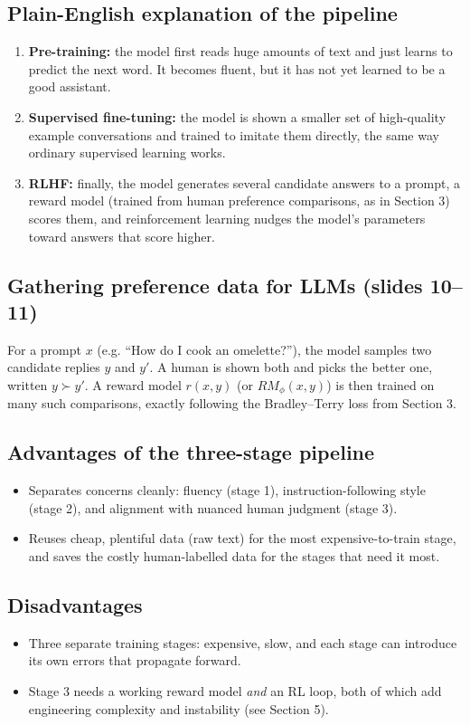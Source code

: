 \documentclass[11pt]{article}
\begin{document}
\subsection{Plain-English explanation of the pipeline}
\begin{enumerate}
  \item \textbf{Pre-training:} the model first reads huge amounts of text and
  just learns to predict the next word. It becomes fluent, but it has not yet
  learned to be a good assistant.
  \item \textbf{Supervised fine-tuning:} the model is shown a smaller set of
  high-quality example conversations and trained to imitate them directly, the
  same way ordinary supervised learning works.
  \item \textbf{RLHF:} finally, the model generates several candidate answers to
  a prompt, a reward model (trained from human preference comparisons, as in
  Section 3) scores them, and reinforcement learning nudges the model's
  parameters toward answers that score higher.
\end{enumerate}

\subsection{Gathering preference data for LLMs (slides 10--11)}
For a prompt $x$ (e.g. ``How do I cook an omelette?''), the model samples two
candidate replies $y$ and $y'$. A human is shown both and picks the better one,
written $y \succ y'$. A reward model $r(x,y)$ (or $RM_\phi(x,y)$) is then trained
on many such comparisons, exactly following the Bradley--Terry loss from
Section 3.

\subsection{Advantages of the three-stage pipeline}
\begin{itemize}
  \item Separates concerns cleanly: fluency (stage 1), instruction-following
  style (stage 2), and alignment with nuanced human judgment (stage 3).
  \item Reuses cheap, plentiful data (raw text) for the most expensive-to-train
  stage, and saves the costly human-labelled data for the stages that need it
  most.
\end{itemize}

\subsection{Disadvantages}
\begin{itemize}
  \item Three separate training stages: expensive, slow, and each stage can
  introduce its own errors that propagate forward.
  \item Stage 3 needs a working reward model \emph{and} an RL loop, both of which
  add engineering complexity and instability (see Section 5).
\end{itemize}
\end{document}
